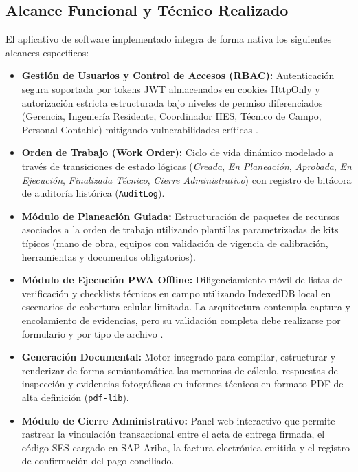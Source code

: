 \subsection{Alcance Funcional y Técnico Realizado}
El aplicativo de software implementado integra de forma nativa los siguientes alcances específicos:
\begin{itemize}
    \item \textbf{Gestión de Usuarios y Control de Accesos (RBAC):} Autenticación segura soportada por tokens JWT almacenados en cookies HttpOnly y autorización estricta estructurada bajo niveles de permiso diferenciados (Gerencia, Ingeniería Residente, Coordinador HES, Técnico de Campo, Personal Contable) mitigando vulnerabilidades críticas \cite{owasp_top10}.
    \item \textbf{Orden de Trabajo (Work Order):} Ciclo de vida dinámico modelado a través de transiciones de estado lógicas (\textit{Creada}, \textit{En Planeación}, \textit{Aprobada}, \textit{En Ejecución}, \textit{Finalizada Técnico}, \textit{Cierre Administrativo}) con registro de bitácora de auditoría histórica (\texttt{AuditLog}).
    \item \textbf{Módulo de Planeación Guiada:} Estructuración de paquetes de recursos asociados a la orden de trabajo utilizando plantillas parametrizadas de kits típicos (mano de obra, equipos con validación de vigencia de calibración, herramientas y documentos obligatorios).
    \item \textbf{Módulo de Ejecución PWA Offline:} Diligenciamiento móvil de listas de verificación y checklists técnicos en campo utilizando IndexedDB local en escenarios de cobertura celular limitada. La arquitectura contempla captura y encolamiento de evidencias, pero su validación completa debe realizarse por formulario y por tipo de archivo \cite{mdn_service_worker}.
    \item \textbf{Generación Documental:} Motor integrado para compilar, estructurar y renderizar de forma semiautomática las memorias de cálculo, respuestas de inspección y evidencias fotográficas en informes técnicos en formato PDF de alta definición (\texttt{pdf-lib}).
    \item \textbf{Módulo de Cierre Administrativo:} Panel web interactivo que permite rastrear la vinculación transaccional entre el acta de entrega firmada, el código SES cargado en SAP Ariba, la factura electrónica emitida y el registro de confirmación del pago conciliado.
\end{itemize}

